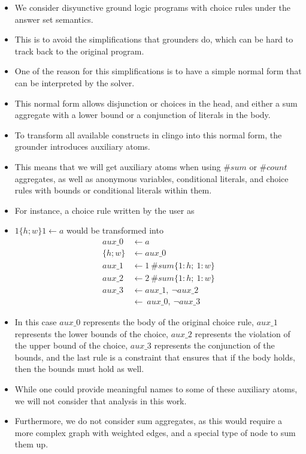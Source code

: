 %
\begin{itemize}
  \item
  We consider disyunctive ground logic programs with choice rules under the answer set semantics.
  \item This is to avoid the simplifications that grounders do, which can be hard to track back to the original program.
  \item One of the reason for this simplifications is to have a simple normal form that can be interpreted by the solver.
  \item This normal form allows disjunction or choices in the head, and either a sum aggregate with a lower bound or a conjunction of literals in the body.
  \cite{kamrom23a} 
  \item To transform all available constructs in clingo into this normal form, the grounder introduces auxiliary atoms.
  \item This means that we will get auxiliary atoms when using
  $\#sum$ or $\#count$ aggregates, as well as
  anonymous variables,
  conditional literals,
  and choice rules with bounds or conditional literals within them.
  \item For instance, a choice rule written by the user as
  \item $1 \{ h;w \} 1\leftarrow a$ would be transformed into
  \begin{align*}
    aux\_0 &\leftarrow a \\
    \{ h;w \} &\leftarrow aux\_0 \\
    aux\_1 &\leftarrow 1\ \#sum\{1:h;\ 1:w\} \\
    aux\_2 &\leftarrow 2\ \#sum\{1:h;\ 1:w\} \\
    aux\_3 &\leftarrow aux\_1,\ \neg aux\_2 \\
    &\leftarrow\ aux\_0,\ \neg aux\_3
  \end{align*}
  \item In this case $aux\_0$ represents the body of the original choice rule,
  $aux\_1$ represents the lower bounds of the choice,
  $aux\_2$ represents the violation of the upper bound of the choice,
  $aux\_3$ represents the conjunction of the bounds,
  and the last rule is a constraint that ensures that if the body holds, then the bounds must hold as well.
  \item While one could provide meaningful names to some of these auxiliary atoms, we will not consider that analysis in this work.
  \item Furthermore, we do not consider sum aggregates, as this would require a more complex graph with weighted edges, and a special type of node to sum them up.

\end{itemize}
%

